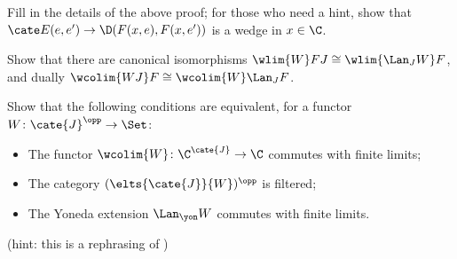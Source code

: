 \begin{exerciseset}
\begin{exercisepoints}
\item Fill in the details of the above proof; for those who need a hint, show that $\cate E(e, e')\to \D(F(x,e), F(x, e'))$ is a wedge in $x\in \C$.
\item Show that there are canonical isomorphisms $\wlim{W}FJ\cong \wlim{\Lan_JW}F$, and dually $\wcolim{WJ}F\cong \wcolim{W}\Lan_JF$.
\item Show that the following conditions are equivalent, for a functor $W \colon \cate{J}^\opp\to \Set$:
\begin{itemize}
	\item The functor $\wcolim{W} \colon \C^\cate{J} \to \C$ commutes with finite limits;
	\item The category $(\elts{\cate{J}}{W})^\opp$ is filtered;
	\item The Yoneda extension $\Lan_\yon W$ commutes with finite limits.
\end{itemize}
(hint: this is a rephrasing of )
\end{exercisepoints}
\end{exerciseset}
